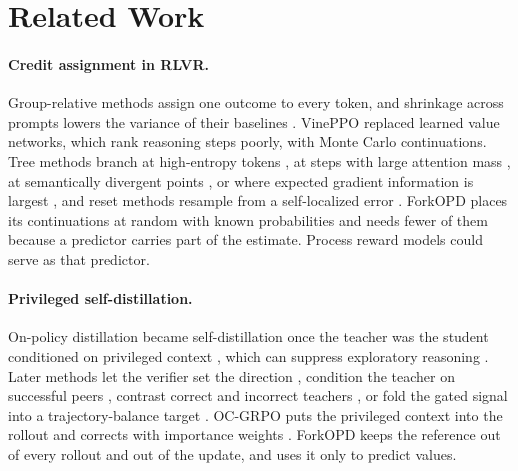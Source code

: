 \documentclass[11pt]{article}
\newcommand{\method}{ForkOPD}
\theoremstyle{remark}
\begin{document}
\section{Related Work}

\paragraph{Credit assignment in RLVR.}
Group-relative methods \citep{shao2024deepseekmath,ahmadian2024back,yu2025dapo} assign one outcome to every token, and shrinkage across prompts lowers the variance of their baselines \citep{zeng2026shrinking}. VinePPO \citep{kazemnejad2025vineppo} replaced learned value networks, which rank reasoning steps poorly, with Monte Carlo continuations. Tree methods branch at high-entropy tokens \citep{hou2025treerl}, at steps with large attention mass \citep{liu2026attention}, at semantically divergent points \citep{zhao2026semantically}, or where expected gradient information is largest \citep{khomich2026epig}, and reset methods resample from a self-localized error \citep{samanta2026resets}. \method{} places its continuations at random with known probabilities and needs fewer of them because a predictor carries part of the estimate. Process reward models \citep{lightman2024verify,wang2024mathshepherd,setlur2025rewarding,yuan2025free} could serve as that predictor.

\paragraph{Privileged self-distillation.}
On-policy distillation \citep{agarwal2024onpolicy} became self-distillation once the teacher was the student conditioned on privileged context \citep{zhao2026opsd,hubotter2026sdpo}, which can suppress exploratory reasoning \citep{kim2026whyselfdistill}. Later methods let the verifier set the direction \citep{yang2026rlsd}, condition the teacher on successful peers \citep{li2026hsd}, contrast correct and incorrect teachers \citep{heakl2026cepo}, or fold the gated signal into a trajectory-balance target \citep{huang2026flowbalance}. OC-GRPO puts the privileged context into the rollout and corrects with importance weights \citep{agrawal2026ocgrpo}. \method{} keeps the reference out of every rollout and out of the update, and uses it only to predict values.
\end{document}
